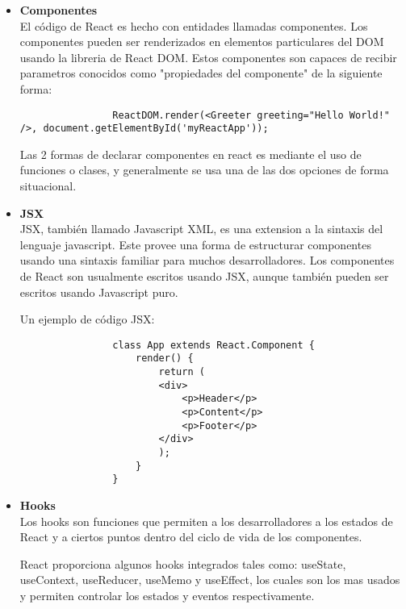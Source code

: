        \begin{itemize}
            \item \textbf{Componentes} \hfill \\

            El código de React es hecho con entidades llamadas componentes. Los componentes pueden ser renderizados en elementos particulares del DOM usando la libreria de React DOM. Estos componentes son capaces de recibir parametros conocidos como "propiedades del componente" de la siguiente forma: \hfill \\

            \begin{lstlisting}
                ReactDOM.render(<Greeter greeting="Hello World!" />, document.getElementById('myReactApp'));
            \end{lstlisting}

            Las 2 formas de declarar componentes en react es mediante el uso de funciones o clases, y generalmente se usa una de las dos opciones de forma situacional.

            \item \textbf{JSX} \hfill \\

            JSX, también llamado Javascript XML, es una extension a la sintaxis del lenguaje javascript. Este provee una forma de estructurar componentes usando una sintaxis familiar para muchos desarrolladores. Los componentes de React son usualmente escritos usando JSX, aunque también pueden ser escritos usando Javascript puro.

            Un ejemplo de código JSX:

            \begin{lstlisting}
                class App extends React.Component {
                    render() {
                        return (
                        <div>
                            <p>Header</p>
                            <p>Content</p>
                            <p>Footer</p>
                        </div>
                        );
                    }
                }
            \end{lstlisting}

            \item \textbf{Hooks} \hfill \\

            Los hooks son funciones que permiten a los desarrolladores  a los estados de React y a ciertos puntos dentro del ciclo de vida de los componentes.

            React proporciona algunos hooks integrados tales como: useState, useContext, useReducer, useMemo y useEffect, los cuales son los mas usados y permiten controlar los estados y eventos respectivamente.


        \end{itemize}
        
